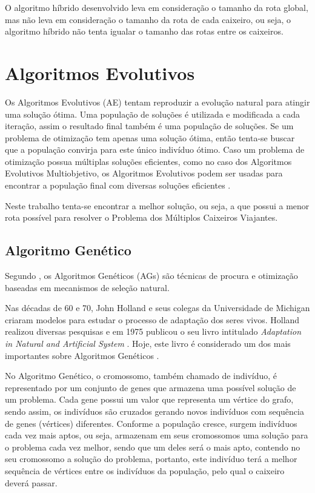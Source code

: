 \documentclass[12pt,openright,a4paper,oneside]{tcc}
\begin{document}
		O algoritmo híbrido desenvolvido leva em consideração o tamanho da rota global, mas não leva em consideração o tamanho da rota de cada caixeiro, ou seja, o algoritmo híbrido não tenta igualar o tamanho das rotas entre os caixeiros.
	
    \chapter{Algoritmos Evolutivos}

        Os Algoritmos Evolutivos (AE) tentam reproduzir a evolução natural para atingir uma solução ótima. Uma população de soluções é utilizada e modificada a cada iteração, assim o resultado final também é uma população de soluções. Se um problema de otimização tem apenas uma solução ótima, então tenta-se buscar que a população convirja para este único indivíduo ótimo. Caso um problema de otimização possua múltiplas soluções eficientes, como no caso dos Algoritmos Evolutivos Multiobjetivo, os Algoritmos Evolutivos podem ser usadas para encontrar a população final com diversas soluções eficientes \cite{malvezzi}.

        Neste trabalho tenta-se encontrar a melhor solução, ou seja, a que possui a menor rota possível para resolver o Problema dos Múltiplos Caixeiros Viajantes.

	\section{Algoritmo Genético}

		Segundo , os Algoritmos Genéticos (AGs) são técnicas de procura e otimização baseadas em mecanismos de seleção natural. 

		Nas décadas de 60 e 70, John Holland e seus colegas da Universidade de Michigan criaram modelos para estudar o processo de adaptação dos seres vivos. Holland realizou diversas pesquisas e em 1975 publicou o seu livro intitulado \textit{Adaptation in Natural and Artificial System} \cite{john}. Hoje, este livro é considerado um dos mais importantes sobre Algoritmos Genéticos \cite{0001-pdf}.

		No Algoritmo Genético, o cromossomo, também chamado de indivíduo, é representado por um conjunto de genes que armazena uma possível solução de um problema. Cada gene possui um valor que representa um vértice do grafo, sendo assim, os indivíduos são cruzados gerando novos indivíduos com sequência de genes (vértices) diferentes. Conforme a população cresce, surgem indivíduos cada vez mais aptos, ou seja, armazenam em seus cromossomos uma solução para o problema cada vez melhor, sendo que um deles será o mais apto, contendo no seu cromossomo a solução do problema, portanto, este indivíduo terá a melhor sequência de vértices entre os indivíduos da população, pelo qual o caixeiro deverá passar.
\end{document}

